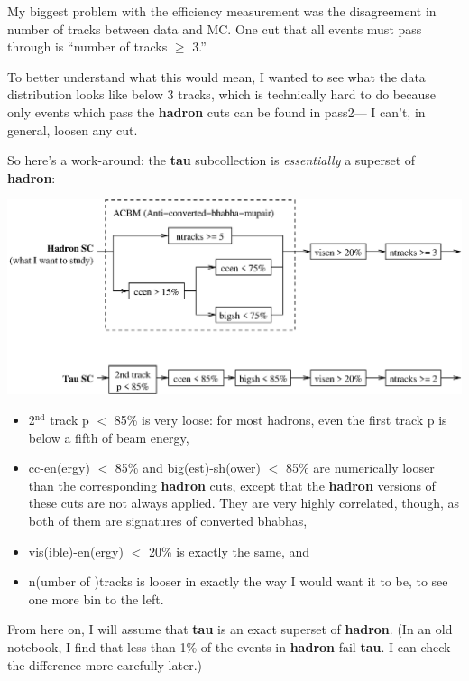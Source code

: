 \documentclass{article}
\begin{document}
\Large

My biggest problem with the efficiency measurement was the
disagreement in number of tracks between data and MC.  One cut that
all events must pass through is ``number of tracks $\ge$ 3.''

To better understand what this would mean, I wanted to see what the
data distribution looks like below 3 tracks, which is technically hard
to do because only events which pass the {\bf hadron} cuts can be
found in pass2--- I can't, in general, loosen any cut.

So here's a work-around: the {\bf tau} subcollection is {\it
essentially} a superset of {\bf hadron}:
\begin{center}
  \includegraphics[width=\linewidth]{cuts.eps}
\end{center}
\begin{itemize}

  \item 2$^{\mbox{nd}}$ track p $<$ 85\% is very loose: for most
  hadrons, even the first track p is below a fifth of beam energy,

  \item cc-en(ergy) $<$ 85\% and big(est)-sh(ower) $<$ 85\% are
  numerically looser than the corresponding {\bf hadron} cuts, except
  that the {\bf hadron} versions of these cuts are not always applied.
  They are very highly correlated, though, as both of them are
  signatures of converted bhabhas,

  \item vis(ible)-en(ergy) $<$ 20\% is exactly the same, and

  \item n(umber of )tracks is looser in exactly the way I would want
  it to be, to see one more bin to the left.

\end{itemize}

From here on, I will assume that {\bf tau} is an exact superset of
{\bf hadron}.  (In an old notebook, I find that less than 1\% of the
events in {\bf hadron} fail {\bf tau}.  I can check the difference
more carefully later.)
\end{document}
